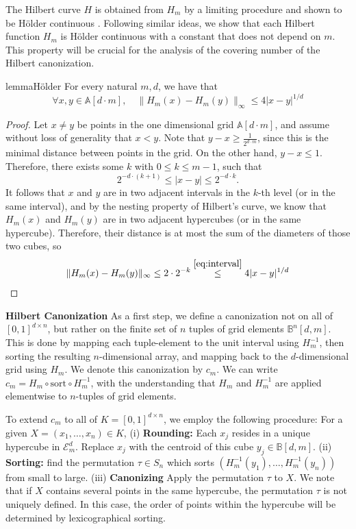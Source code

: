 The Hilbert curve $H$ is obtained from $H_m$ by a limiting procedure and shown to be Hölder continuous \cite{Hilbert}. Following similar ideas, we show that each Hilbert function $H_m$ is Hölder continuous with a constant that does not depend on $m$. This property will be crucial for the analysis of the covering number of the Hilbert canonization.
\begin{restatable}{lemma}{Hölder}\label{lem:Hölder}
For every natural $m,d$, we have that
$$\forall x,y\in \mathbb{A}[d\cdot m], \quad  \|H_m(x)-H_m(y)\|_\infty \leq 4|x-y|^{1/d} $$
\end{restatable}
\begin{proof}
    Let $x\neq y$ be points in the one dimensional grid $\mathbb{A}[d\cdot m]$, and assume without loss of generality that $x<y$. Note that $y-x\geq \frac{1}{2^{d\cdot m}}$, since this is the minimal distance between points in the grid. On the other hand, $y-x\leq 1$. Therefore, there exists some $k$ with $0\leq k \leq m-1 $, such that
    \begin{equation}\label{eq:interval}
    2^{-d\cdot (k+1)}\leq |x-y|\leq 2^{-d \cdot k}.
    \end{equation}
   It follows that $x$ and $y$ are in two adjacent intervals in the $k$-th level (or in the same interval), and by the nesting property of Hilbert's curve, we know that $H_m(x)$ and $H_m(y)$ are in two adjacent hypercubes (or in the same hypercube). Therefore, their distance is at most the sum of the diameters of those two cubes, so
    \begin{align*}
    \|H_m(x)-H_m(y)\|_\infty\leq 2\cdot 2^{-k}\stackrel{\eqref{eq:interval}}{\leq} 4|x-y|^{1/d}
    \end{align*}
\end{proof}


\textbf{Hilbert Canonization}
As a first step, we define a canonization not on all of $[0,1]^{d\times n}$, but rather on the finite set of $n$ tuples of grid elements $\mathbb{B}^n[d,m] $. This is done by mapping each tuple-element to the unit interval using $H_m^{-1} $, then sorting the resulting $n$-dimensional array, and mapping back to the $d$-dimensional grid using $H_m$. We denote this canonization by $c_m$. We can write $c_m=H_m \circ \mathrm{sort}\circ H_m^{-1}$, with the understanding that $H_m$ and  $H_m^{-1} $ are applied elementwise to $n$-tuples of grid elements.

To extend $c_m$ to all of $K=[0,1]^{d\times n}$, we employ the following procedure: For a given $X=(x_1,\ldots,x_n)\in K  $, (i) \textbf{Rounding:} Each $x_j$ resides in a unique hypercube in $ \mathcal{E}_m^d$. Replace $x_j$ with the centroid of this cube $y_j\in \mathbb{B}[d,m] $. (ii) \textbf{Sorting:} find the permutation $\tau \in S_n$ which sorts $\left(H_m^{-1}(y_1),\ldots,H_m^{-1}(y_n) \right)$ from small to large. (iii) \textbf{Canonizing} Apply the permutation $\tau$ to $X$. We note that if $X$ contains several points in the same hypercube, the permutation $\tau$ is not uniquely defined. In this case, the order of points within the hypercube will be determined by lexicographical sorting.

